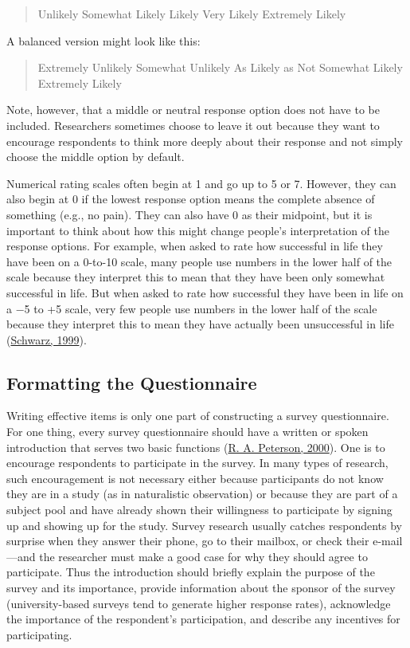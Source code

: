 \documentclass[
]{krantz}
\begin{document}
\begin{quote}
Unlikely \textbar{} Somewhat Likely \textbar{} Likely \textbar{} Very Likely \textbar{} Extremely Likely
\end{quote}

A balanced version might look like this:

\begin{quote}
Extremely Unlikely \textbar{} Somewhat Unlikely \textbar{} As Likely as Not \textbar{} Somewhat Likely \textbar{} Extremely Likely
\end{quote}

Note, however, that a middle or neutral response option does not have to be included. Researchers sometimes choose to leave it out because they want to encourage respondents to think more deeply about their response and not simply choose the middle option by default.

Numerical rating scales often begin at 1 and go up to 5 or 7. However, they can also begin at 0 if the lowest response option means the complete absence of something (e.g., no pain). They can also have 0 as their midpoint, but it is important to think about how this might change people's interpretation of the response options. For example, when asked to rate how successful in life they have been on a 0-to-10 scale, many people use numbers in the lower half of the scale because they interpret this to mean that they have been only somewhat successful in life. But when asked to rate how successful they have been in life on a −5 to +5 scale, very few people use numbers in the lower half of the scale because they interpret this to mean they have actually been unsuccessful in life (\protect\hyperlink{ref-schwarz1999self}{Schwarz, 1999}).

\hypertarget{formatting-the-questionnaire}{%
\subsection*{Formatting the Questionnaire}\label{formatting-the-questionnaire}}


Writing effective items is only one part of constructing a survey questionnaire. For one thing, every survey questionnaire should have a written or spoken introduction that serves two basic functions (\protect\hyperlink{ref-peterson2000constructing}{R. A. Peterson, 2000}). One is to encourage respondents to participate in the survey. In many types of research, such encouragement is not necessary either because participants do not know they are in a study (as in naturalistic observation) or because they are part of a subject pool and have already shown their willingness to participate by signing up and showing up for the study. Survey research usually catches respondents by surprise when they answer their phone, go to their mailbox, or check their e-mail---and the researcher must make a good case for why they should agree to participate. Thus the introduction should briefly explain the purpose of the survey and its importance, provide information about the sponsor of the survey (university-based surveys tend to generate higher response rates), acknowledge the importance of the respondent's participation, and describe any incentives for participating.
\end{document}
